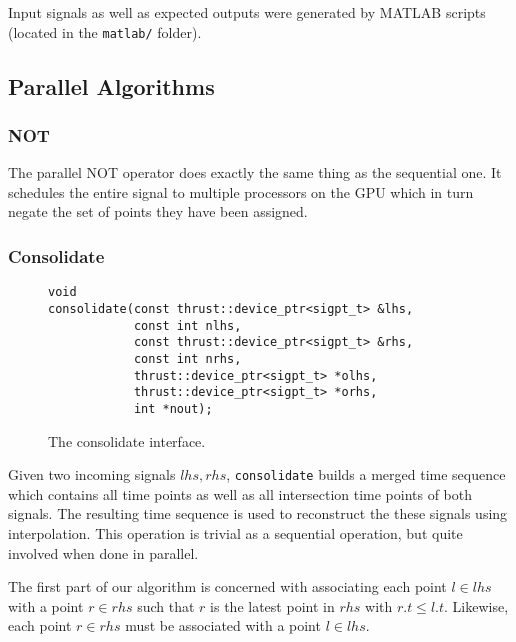 \documentclass[a4paper,10pt]{article}
\begin{document}
Input signals as well as expected outputs were generated by MATLAB scripts (located
in the \verb|matlab/| folder).


\subsection{Parallel Algorithms}

\subsubsection{NOT}

The parallel NOT operator does exactly the same thing as the sequential one. It
schedules the entire signal to multiple processors on the GPU which in turn negate
the set of points they have been assigned.

\subsubsection{Consolidate}

\begin{figure}[H]
\begin{lstlisting}
void
consolidate(const thrust::device_ptr<sigpt_t> &lhs,
            const int nlhs,
            const thrust::device_ptr<sigpt_t> &rhs,
            const int nrhs,
            thrust::device_ptr<sigpt_t> *olhs,
            thrust::device_ptr<sigpt_t> *orhs,
            int *nout);
\end{lstlisting}
\caption{
\label{fig:parallel_consolidate}
The consolidate interface.}
\end{figure}

Given two incoming signals $lhs, rhs$, \lstinline|consolidate| builds a
merged time sequence which contains all time points as well as all intersection
time points of both signals. The resulting time sequence is used to reconstruct
the these signals using interpolation. This operation is trivial as a sequential
operation, but quite involved when done in parallel.

The first part of our algorithm is concerned with associating each point $l \in lhs$
with a point $r \in rhs$ such that $r$ is the latest point in $rhs$ with $r.t \leq l.t$. Likewise, each point $r \in rhs$ must be associated with a point $l \in lhs$.
\end{document}
